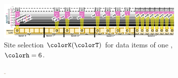 \begin{figure}[htbp!]
  \flushleft
  \begin{subfigure}[b]{1.008\linewidth}
    \hspace{-1.7ex}
    \includegraphics[width=\textwidth, trim={0cm 0cm 0cm 1cm}, clip]{img/hsurf-steady-intuition}
    \vspace{-2ex}
    \caption{\footnotesize Site selection $\colorK(\colorT)$ for data items of one \hv{}, $\colorh = 6$.}
    \label{fig:hsurf-steady-intuition-diagram}
  \end{subfigure}
\vspace{-5ex}
  \flushright
  \begin{subfigure}[b]{0.98\linewidth}
    \includegraphics[width=0.011\textwidth, trim={0.2cm 2.8cm 31.8cm 2.8cm}, clip]{binder/teeplots/12/reservation-mode=steady-full+surface-size=32+viz=site-reservation-at-ranks-heatmap+ext=.pdf}%
\end{subfigure}
\end{figure}
